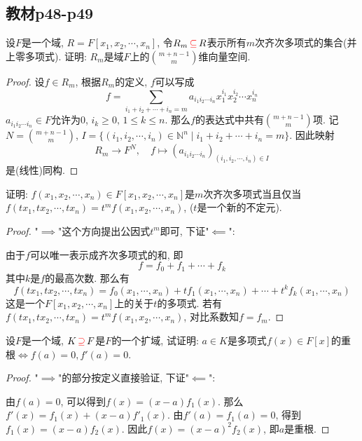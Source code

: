 \subsection{教材p48-p49}

\begin{problem}
    设$F$是一个域, $R = F[x_1, x_2, \cdots, x_n]$, 令$R_m \,\textcolor{red}{\subseteq}\, R$表示所有$m$次齐次多项式的集合(并上零多项式). 证明: $R_m$是域$F$上的$\binom{m + n - 1}{m}$维向量空间.
\end{problem}

\begin{proof}
    设$f \in R_m$, 根据$R_m$的定义, $f$可以写成
    \[
        f = \sum_{i_1 + i_2 + \cdots + i_n = m} a_{i_1i_2 \cdots i_n}x_1^{i_1}x_2^{i_2} \cdots x_n^{i_n}
    \]
    $a_{i_1i_2 \cdots i_n} \in F$允许为$0$, $i_k \geqslant 0,\, 1 \leqslant k \leqslant n$. 那么$f$的表达式中共有$\binom{m + n - 1}{m}$项. 记$N = \binom{m + n - 1}{m}$, $I = \{(i_1, i_2, \cdots, i_n) \in \mathbb{N}^n \mid i_1 + i_2 + \cdots + i_n = m\}$. 因此映射
    \[
        R_m \to F^{N},\quad f \mapsto (a_{i_1i_2 \cdots i_n})_{(i_1, i_2, \cdots, i_n) \in I}
    \]
    是(线性)同构.
\end{proof}

\begin{problem}
    证明: $f(x_1, x_2, \cdots, x_n) \in F[x_1, x_2, \cdots, x_n]$是$m$次齐次多项式当且仅当$f(tx_1, tx_2, \cdots, tx_n) = t^mf(x_1, x_2, \cdots, x_n)$, ($t$是一个新的不定元).
\end{problem}

\begin{proof}
    "$\implies$"这个方向提出公因式$t^m$即可, 下证"$\impliedby$":

    由于$f$可以唯一表示成齐次多项式的和, 即
    \[
        f = f_0 + f_1 + \cdots + f_k
    \]
    其中$k$是$f$的最高次数. 那么有
    \[
        f(tx_1, tx_2, \cdots, tx_n) = f_0(x_1, \cdots, x_n) + tf_1(x_1, \cdots, x_n) + \cdots + t^kf_k(x_1, \cdots, x_n)
    \]
    这是一个$F[x_1, x_2, \cdots, x_n]$上的关于$t$的多项式. 若有$f(tx_1, tx_2, \cdots, tx_n) = t^mf(x_1, x_2, \cdots, x_n)$, 对比系数知$f = f_m$.
\end{proof}

\begin{problem}\label{ex:2.4.3}
    设$F$是一个域, $K \,\textcolor{red}{\supseteq}\, F$是$F$的一个扩域, 试证明: $a \in K$是多项式$f(x) \in F[x]$的重根$\Leftrightarrow f(a) = 0, f'(a) = 0$.
\end{problem}

\begin{proof}
    "$\implies$"的部分按定义直接验证, 下证"$\impliedby$":

    由$f(a) = 0$, 可以得到$f(x) = (x - a)f_1(x)$. 那么$f'(x) = f_1(x) + (x - a)f'_1(x)$. 由$f'(a) = f_1(a) = 0$, 得到$f_1(x) = (x - a)f_2(x)$. 因此$f(x) = (x - a)^2f_2(x)$, 即$a$是重根.
\end{proof}

